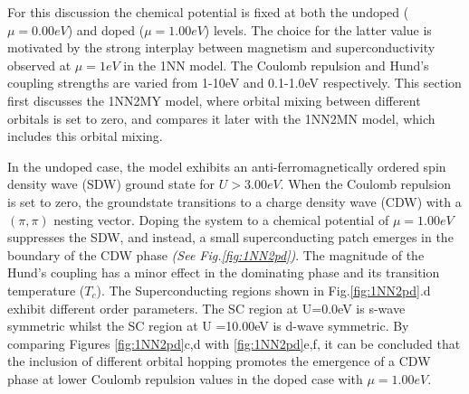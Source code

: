 \documentclass[12pt]{article}
\begin{document}
\noindent For this discussion the chemical potential is fixed at both the undoped ($\mu = 0.00eV $) and doped ($\mu =1.00eV$) levels. The choice for the latter value is motivated 
by the strong interplay between magnetism and superconductivity observed at $\mu=1eV$ in the 1NN model.  The Coulomb repulsion and Hund's coupling strengths are varied from 1-10eV and 0.1-1.0eV respectively.
This section first discusses the 1NN2MY model, where orbital mixing between different orbitals is set to zero, and compares it later with the 1NN2MN model, which includes this orbital mixing. \par
\medskip
\noindent In the undoped case, the model exhibits an anti-ferromagnetically ordered spin density wave (SDW) ground state
for $U > 3.00eV$. When the Coulomb repulsion is set to zero, the groundstate transitions to a charge density wave (CDW) with a $(\pi, \pi)$ nesting vector. 
Doping the system to a chemical potential of $\mu = 1.00eV$ suppresses the SDW, and instead, a small superconducting patch 
emerges in the boundary of the CDW phase \textit{(See Fig.{\ref{fig:1NN2pd}})}. The magnitude of the Hund's coupling has a minor effect in the dominating phase and its transition temperature ($T_c$).
The Superconducting regions shown in Fig.\ref{fig:1NN2pd}.d exhibit different order parameters. The SC region at U=0.0eV is s-wave symmetric whilst the SC region at U =10.00eV
is d-wave symmetric. By comparing Figures \ref{fig:1NN2pd}c,d with \ref{fig:1NN2pd}e,f, it can be concluded that the inclusion of different orbital hopping promotes the emergence of a CDW phase at lower Coulomb repulsion values in the doped case with $\mu = 1.00eV$.
\end{document}
